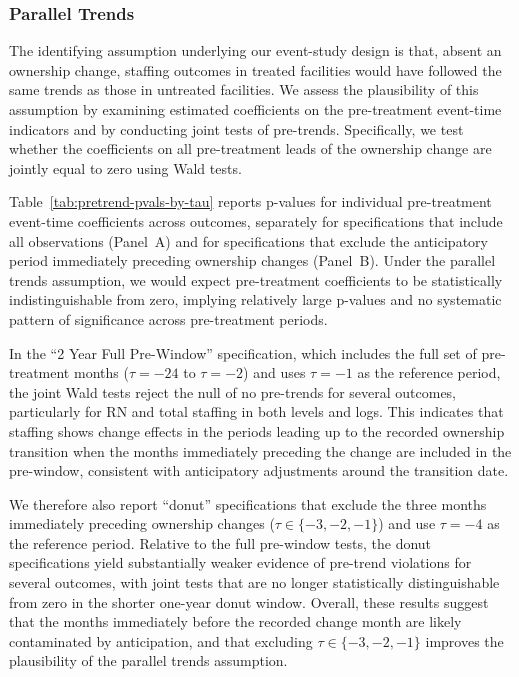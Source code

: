 \documentclass[preprint,authoryear]{elsarticle}
\begin{document}
\subsubsection{Parallel Trends}

The identifying assumption underlying our event-study design is that, absent an ownership change, staffing outcomes in treated facilities would have followed the same trends as those in untreated facilities. We assess the plausibility of this assumption by examining estimated coefficients on the pre-treatment event-time indicators and by conducting joint tests of pre-trends. Specifically, we test whether the coefficients on all pre-treatment leads of the ownership change are jointly equal to zero using Wald tests. 

Table~\ref{tab:pretrend-pvals-by-tau} reports p-values for individual pre-treatment event-time coefficients across outcomes, separately for specifications that include all observations (Panel~A) and for specifications that exclude the anticipatory period immediately preceding ownership changes (Panel~B). Under the parallel trends assumption, we would expect pre-treatment coefficients to be statistically indistinguishable from zero, implying relatively large p-values and no systematic pattern of significance across pre-treatment periods.

In the ``2 Year Full Pre-Window'' specification, which includes the full set of pre-treatment months ($\tau=-24$ to $\tau=-2$) and uses $\tau=-1$ as the reference period, the joint Wald tests reject the null of no pre-trends for several outcomes, particularly for RN and total staffing in both levels and logs. This indicates that staffing shows change effects in the periods leading up to the recorded ownership transition when the months immediately preceding the change are included in the pre-window, consistent with anticipatory adjustments around the transition date.

We therefore also report ``donut'' specifications that exclude the three months immediately preceding ownership changes ($\tau\in\{-3,-2,-1\}$) and use $\tau=-4$ as the reference period. Relative to the full pre-window tests, the donut specifications yield substantially weaker evidence of pre-trend violations for several outcomes, with joint tests that are no longer statistically distinguishable from zero in the shorter one-year donut window. Overall, these results suggest that the months immediately before the recorded change month are likely contaminated by anticipation, and that excluding $\tau\in\{-3,-2,-1\}$ improves the plausibility of the parallel trends assumption.
\end{document}
